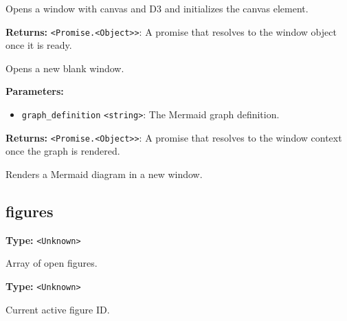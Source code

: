 \documentclass[12pt,a4paper]{article}
\begin{document}
\noindent Opens a window with canvas and D3 and initializes the canvas element.

\vspace{5mm}
\noindent {}


\noindent \textbf{Returns:} \texttt{<Promise.<Object>>}: A promise that resolves to the window object once it is ready.

\noindent Opens a new blank window.

\vspace{5mm}
\noindent {}


\noindent \textbf{Parameters:}
\begin{itemize}
  \item \texttt{graph\_definition} \texttt{<string>}: The Mermaid graph definition.
\end{itemize}

\noindent \textbf{Returns:} \texttt{<Promise.<Object>>}: A promise that resolves to the window context once the graph is rendered.

\noindent Renders a Mermaid diagram in a new window.


\subsection{figures}
\vspace{5mm}
\noindent {}\vspace{4mm}


\noindent \textbf{Type:} \texttt{<Unknown>}

\noindent Array of open figures.

\vspace{5mm}
\noindent {}\vspace{4mm}


\noindent \textbf{Type:} \texttt{<Unknown>}

\noindent Current active figure ID.

\vspace{5mm}
\noindent {}
\end{document}
